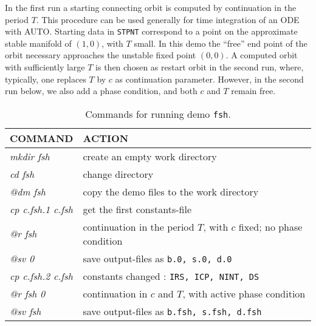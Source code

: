 \documentclass[12pt]{report}
\begin{document}
In the first run a starting connecting orbit is computed 
by continuation in the period $T$.
This procedure can be used generally for time integration of an ODE with {\cal AUTO}.
Starting data in {\tt STPNT} correspond to a point on the approximate stable manifold
of $(1,0)$, with $T$ small.
In this demo the ``free'' end point of the orbit necessary approaches the
unstable fixed point $(0,0)$.
A computed orbit with sufficiently large $T$ is then chosen as restart orbit
in the second run, where, typically, one replaces $T$ by $c$ as continuation
parameter.
However, in the second run below, we also add a phase condition, 
and both $c$ and $T$ remain free.



\begin{table}[htbp]
\begin{center}
\begin{tabular}{| l | l |}
\hline
  COMMAND  & ACTION \\
\hline
  {\it mkdir fsh} & create an empty work directory \\ 
  {\it cd fsh} & change directory \\
  {\it @dm fsh} & copy the demo files to the work directory \\
\hline
  {\it cp c.fsh.1 c.fsh} & get the first constants-file \\ 
  {\it @r fsh} & continuation in the period $T$, with $c$ fixed; no phase condition \\ 
  {\it @sv 0} & save output-files as {\tt b.0, s.0, d.0} \\ 
\hline
  {\it cp c.fsh.2 c.fsh} & constants changed : {\tt IRS, ICP, NINT, DS} \\ 
  {\it @r fsh 0} & continuation in $c$ and $T$, with active phase condition \\ 
  {\it @sv fsh} & save output-files as {\tt b.fsh, s.fsh, d.fsh} \\ 
\hline
\end{tabular}
\caption{Commands for running demo {\tt fsh}.}
\label{tbl:demo_fsh}
\end{center}
\end{table}

\newpage
\end{document}

